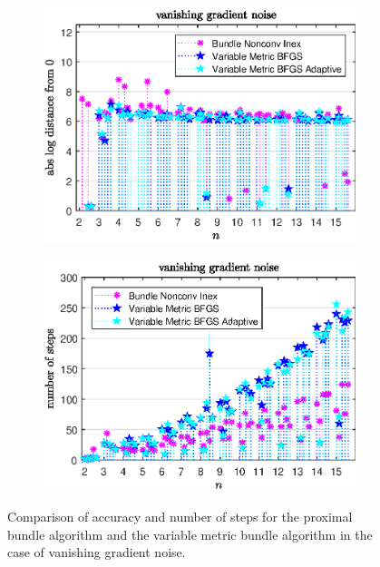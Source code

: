 \vspace{-1.5em}

\begin{figure}[H]
	\begin{subfigure}{0.49\textwidth}
		\includegraphics[width=\textwidth]{Pictures/Plots/vanishing_gradient_noise.eps}%
	\end{subfigure}%
	\hfill
	\begin{subfigure}{0.49\textwidth}
		\includegraphics[width=\textwidth]{Pictures/Plots/steps_vanishing_gradient_noise.eps}%
	\end{subfigure}
	\caption[Accuracy and number of steps: vanishing gradient noise]{Comparison of accuracy and number of steps for the proximal bundle algorithm and the variable metric bundle algorithm in the case of vanishing gradient noise.}%
	\label{fig_van_grad_noise}%
\end{figure}


